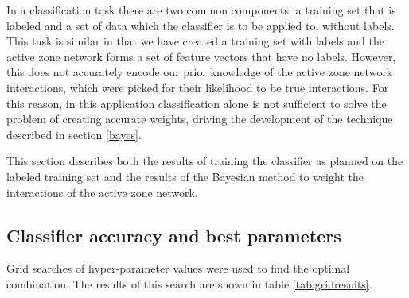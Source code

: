 In a classification task there are two common components: a training set that is labeled and a set of data which the classifier is to be applied to, without labels.
This task is similar in that we have created a training set with labels and the active zone network forms a set of feature vectors that have no labels.
However, this does not accurately encode our prior knowledge of the active zone network interactions, which were picked for their likelihood to be true interactions.
For this reason, in this application classification alone is not sufficient to solve the problem of creating accurate weights, driving the development of the technique described in section \ref{bayes}.

This section describes both the results of training the classifier as planned on the labeled training set and the results of the Bayesian method to weight the interactions of the active zone network.

\subsection{Classifier accuracy and best parameters}
\label{gridresults}

Grid searches of hyper-parameter values were used to find the optimal combination.
The results of this search are shown in table \ref{tab:gridresults}.

